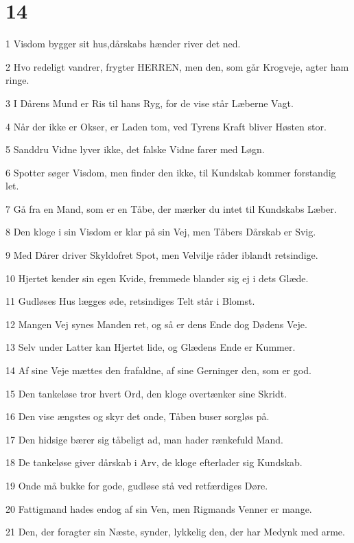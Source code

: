 \chapter{14}

\par 1 Visdom bygger sit hus,dårskabs hænder river det ned.
\par 2 Hvo redeligt vandrer, frygter HERREN, men den, som går Krogveje, agter ham ringe.
\par 3 I Dårens Mund er Ris til hans Ryg, for de vise står Læberne Vagt.
\par 4 Når der ikke er Okser, er Laden tom, ved Tyrens Kraft bliver Høsten stor.
\par 5 Sanddru Vidne lyver ikke, det falske Vidne farer med Løgn.
\par 6 Spotter søger Visdom, men finder den ikke, til Kundskab kommer forstandig let.
\par 7 Gå fra en Mand, som er en Tåbe, der mærker du intet til Kundskabs Læber.
\par 8 Den kloge i sin Visdom er klar på sin Vej, men Tåbers Dårskab er Svig.
\par 9 Med Dårer driver Skyldofret Spot, men Velvilje råder iblandt retsindige.
\par 10 Hjertet kender sin egen Kvide, fremmede blander sig ej i dets Glæde.
\par 11 Gudløses Hus lægges øde, retsindiges Telt står i Blomst.
\par 12 Mangen Vej synes Manden ret, og så er dens Ende dog Dødens Veje.
\par 13 Selv under Latter kan Hjertet lide, og Glædens Ende er Kummer.
\par 14 Af sine Veje mættes den frafaldne, af sine Gerninger den, som er god.
\par 15 Den tankeløse tror hvert Ord, den kloge overtænker sine Skridt.
\par 16 Den vise ængstes og skyr det onde, Tåben buser sorgløs på.
\par 17 Den hidsige bærer sig tåbeligt ad, man hader rænkefuld Mand.
\par 18 De tankeløse giver dårskab i Arv, de kloge efterlader sig Kundskab.
\par 19 Onde må bukke for gode, gudløse stå ved retfærdiges Døre.
\par 20 Fattigmand hades endog af sin Ven, men Rigmands Venner er mange.
\par 21 Den, der foragter sin Næste, synder, lykkelig den, der har Medynk med arme.
